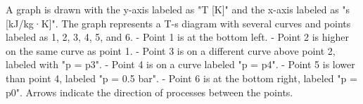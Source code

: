 A graph is drawn with the y-axis labeled as "T [K]" and the x-axis labeled as "s [kJ/kg·K]". The graph represents a T-s diagram with several curves and points labeled as 1, 2, 3, 4, 5, and 6.  
- Point 1 is at the bottom left.  
- Point 2 is higher on the same curve as point 1.  
- Point 3 is on a different curve above point 2, labeled with "p = p3".  
- Point 4 is on a curve labeled "p = p4".  
- Point 5 is lower than point 4, labeled "p = 0.5 bar".  
- Point 6 is at the bottom right, labeled "p = p0".  
Arrows indicate the direction of processes between the points.